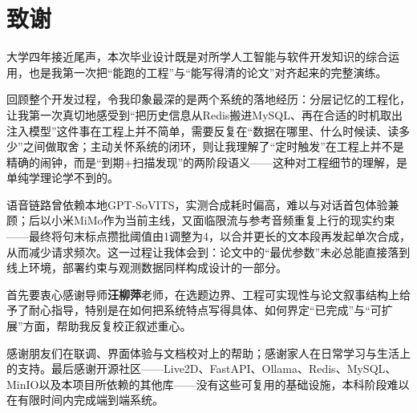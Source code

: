 \documentclass{base}
\begin{document}
\clearpage
\chapter*{致谢}

大学四年接近尾声，本次毕业设计既是对所学人工智能与软件开发知识的综合运用，也是我第一次把``能跑的工程''与``能写得清的论文''对齐起来的完整演练。

回顾整个开发过程，令我印象最深的是两个系统的落地经历：分层记忆的工程化，让我第一次真切地感受到``把历史信息从Redis搬进MySQL、再在合适的时机取出注入模型''这件事在工程上并不简单，需要反复在``数据在哪里、什么时候读、读多少''之间做取舍；主动关怀系统的闭环，则让我理解了``定时触发''在工程上并不是精确的闹钟，而是``到期+扫描发现''的两阶段语义——这种对工程细节的理解，是单纯学理论学不到的。

语音链路曾依赖本地GPT-SoVITS，实测合成耗时偏高，难以与对话首包体验兼顾；后以小米MiMo作为当前主线，又面临限流与参考音频重复上行的现实约束——最终将句末标点攒批阈值由1调整为4，以合并更长的文本段再发起单次合成，从而减少请求频次。这一过程让我体会到：论文中的``最优参数''未必总能直接落到线上环境，部署约束与观测数据同样构成设计的一部分。

首先要衷心感谢导师\textbf{汪柳萍}老师，在选题边界、工程可实现性与论文叙事结构上给予了耐心指导，特别是在如何把系统特点写得具体、如何界定``已完成''与``可扩展''方面，帮助我反复校正叙述重心。

感谢朋友们在联调、界面体验与文档校对上的帮助；感谢家人在日常学习与生活上的支持。最后感谢开源社区——Live2D、FastAPI、Ollama、Redis、MySQL、MinIO以及本项目所依赖的其他库——没有这些可复用的基础设施，本科阶段难以在有限时间内完成端到端系统。
\end{document}
